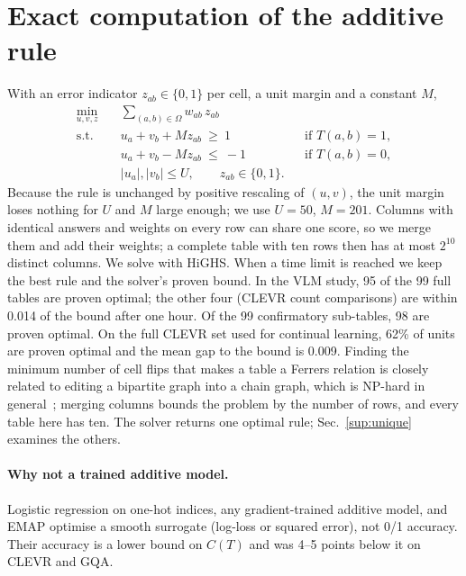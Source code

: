 \section{Exact computation of the additive rule}
\label{sup:milp}

With an error indicator $z_{ab}\in\{0,1\}$ per cell, a unit margin and a constant $M$,
\begin{align}
  \min_{u,v,z}\quad & \textstyle\sum_{(a,b)\in\Omega} w_{ab}\,z_{ab}\\
  \text{s.t.}\quad & u_a+v_b+M z_{ab}\ \ge\ 1 && \text{if } T(a,b)=1,\nonumber\\
  & u_a+v_b-M z_{ab}\ \le\ -1 && \text{if } T(a,b)=0,\nonumber\\
  & |u_a|,|v_b|\le U,\qquad z_{ab}\in\{0,1\}.\nonumber
\end{align}
Because the rule is unchanged by positive rescaling of $(u,v)$, the unit margin loses nothing
for $U$ and $M$ large enough; we use $U=50$, $M=201$. Columns with identical answers and
weights on every row can share one score, so we merge them and add their weights; a complete
table with ten rows then has at most $2^{10}$ distinct columns. We solve with HiGHS. When a
time limit is reached we keep the best rule and the solver's proven bound. In the VLM study,
95 of the 99 full tables are proven optimal; the other four (CLEVR count comparisons) are within
0.014 of the bound after one hour. Of the 99 confirmatory sub-tables, 98 are proven optimal. On
the full CLEVR set used for continual learning, 62\% of units are proven optimal and the mean
gap to the bound is 0.009. Finding the minimum number of cell flips that makes a table a Ferrers
relation is closely related to editing a bipartite graph into a chain graph, which is NP-hard in
general~\cite{yannakakis1981computing,natanzon2001complexity}; merging columns bounds the problem by the number of
rows, and every table here has ten. The solver returns one optimal rule; Sec.~\ref{sup:unique} examines the others.

\paragraph{Why not a trained additive model.}
Logistic regression on one-hot indices, any gradient-trained additive model, and EMAP optimise
a smooth surrogate (log-loss or squared error), not 0/1 accuracy. Their accuracy is a lower
bound on $C(T)$ and was 4--5 points below it on CLEVR and GQA.

